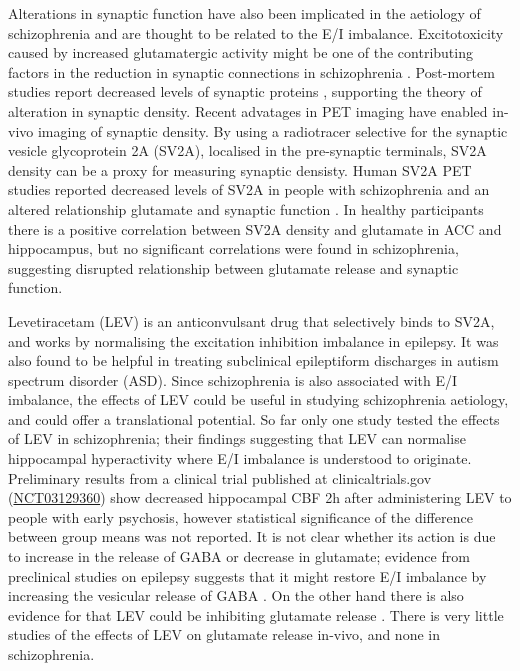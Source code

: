 \documentclass[
  letterpaper,
  DIV=11,
  numbers=noendperiod]{scrartcl}
\begin{document}
Alterations in synaptic function have also been implicated in the
aetiology of schizophrenia \autocite{howes_synaptic_2023} and are
thought to be related to the E/I imbalance. Excitotoxicity caused by
increased glutamatergic activity might be one of the contributing
factors in the reduction in synaptic connections in schizophrenia
\autocite{glantz_apoptotic_2006}. Post-mortem studies report decreased
levels of synaptic proteins \autocite{osimo_synaptic_2019}, supporting
the theory of alteration in synaptic density. Recent advatages in PET
imaging have enabled in-vivo imaging of synaptic density. By using a
radiotracer selective for the synaptic vesicle glycoprotein 2A (SV2A),
localised in the pre-synaptic terminals, SV2A density can be a proxy for
measuring synaptic densisty. Human SV2A PET studies reported decreased
levels of SV2A in people with schizophrenia
\autocite{radhakrishnan_vivo_2021,onwordi_synaptic_2020} and an altered
relationship glutamate and synaptic function
\autocite{onwordi_relationship_2021}. In healthy participants there is a
positive correlation between SV2A density and glutamate in ACC and
hippocampus, but no significant correlations were found in
schizophrenia\autocite{onwordi_relationship_2021}, suggesting disrupted
relationship between glutamate release and synaptic function.

Levetiracetam (LEV) is an anticonvulsant drug that selectively binds to
SV2A, and works by normalising the excitation inhibition imbalance in
epilepsy. It was also found to be helpful in treating subclinical
epileptiform discharges in autism spectrum disorder
(ASD)\autocite{wang_levetiracetam_2017}. Since schizophrenia is also
associated with E/I imbalance, the effects of LEV could be useful in
studying schizophrenia aetiology, and could offer a translational
potential. So far only one study tested the effects of LEV in
schizophrenia; their findings suggesting that LEV can normalise
hippocampal hyperactivity \autocite{roeske_modulation_2023} where E/I
imbalance is understood to originate. Preliminary results from a
clinical trial published at clinicaltrials.gov
(\href{https://clinicaltrials.gov/study/NCT03129360?id=NCT03129360&limit=10&rank=1&tab=results}{NCT03129360})\autocite{goff_levetiracetam_2020}
show decreased hippocampal CBF 2h after administering LEV to people with
early psychosis, however statistical significance of the difference
between group means was not reported. It is not clear whether its action
is due to increase in the release of GABA or decrease in
glutamate\autocite{contreras-garcia_levetiracetam_2022}; evidence from
preclinical studies on epilepsy suggests that it might restore E/I
imbalance by increasing the vesicular release of GABA
\autocite{luzadriana_effect_2018}. On the other hand there is also
evidence for that LEV could be inhibiting glutamate release
\autocite{contreras-garcia_synaptic_2021,meehan_levetiracetam_2012,yang_prolonged_2007,lee_levetiracetam_2009}.
There is very little studies of the effects of LEV on glutamate release
in-vivo, and none in schizophrenia.
\end{document}
